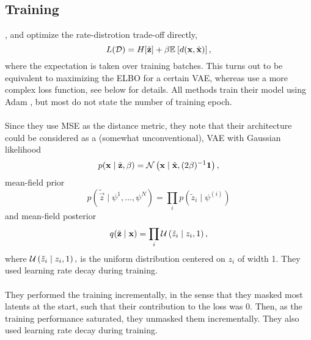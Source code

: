 \subsection{Training}
\par
\cite{balle2016end}, \cite{theis2017lossy} and \cite{balle2018variational}
optimize the rate-distrotion trade-off directly,
\[
  L(\mathcal{D}) = H[\hat{\mathbf{z}}] + \beta \mathbb{E}_{}\left[ d(\mathbf{x}, \hat{\mathbf{x}}) \right],
\]
where the expectation is taken over training batches. This turns out to be
equivalent to maximizing the ELBO for a certain VAE, whereas \cite{rippel2017real} use a
more complex loss function, see below for details. All methods train their model
using Adam \cite{kingma2014adam}, but most do not state the number of
training epoch.

\paragraph{\cite{balle2016end}} Since they use MSE as the distance metric,
they note that their
architecture could be considered as a (somewhat
unconventional), VAE with Gaussian likelihood
\[
  p(\mathbf{x} \mid \tilde{\mathbf{z}}, \beta) =
  \mathcal{N}\left( \mathbf{x} \mid \hat{\mathbf{x}}, (2\beta)^{-1}\mathbf{1} \right),
\]
mean-field prior
\[
  p(\tilde{\vec{z}} \mid \psi^{1}, \hdots, \psi^{N}) =
  \prod_i p(\tilde{z}_i \mid \psi^{(i)})
\]
and mean-field posterior
\[
  q(\tilde{\mathbf{z}} \mid \mathbf{x}) =
  \prod_i \mathcal{U}\left( \tilde{z}_i \mid z_i, 1 \right),
\]
where $\mathcal{U}\left( \tilde{z}_i \mid z_i, 1 \right),$ is the uniform distribution centered
on $z_i$ of width 1. They used learning rate decay during training.

\paragraph{\cite{theis2017lossy}}
  They performed the training incrementally, in the sense that they masked most
  latents at the start, such that their contribution to the loss was 0. Then, as
  the training performance saturated, they unmasked them incrementally. They
  also used learning rate decay during training.

